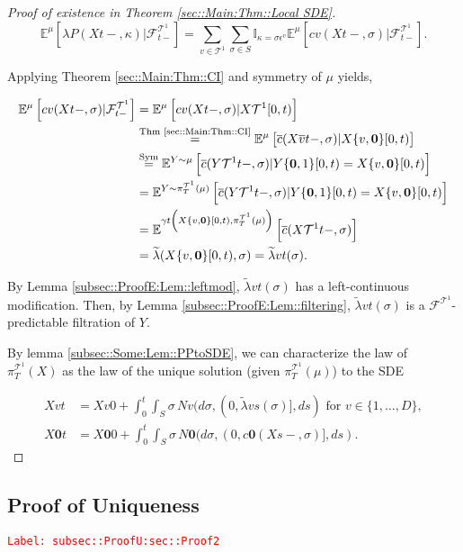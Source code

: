 \documentclass[12pt]{article}
\newcommand{\mb}{\mathbb}
\newcommand{\mc}{\mathcal}
\newcommand{\ov}{\overline}
\newcommand{\os}{\overset}
\newcommand{\te}{\text}
\newcommand{\ep}{\epsilon}
\newcommand{\tr}{\textcolor{red}}
\newcommand{\labe}[1]{\tr{\texttt{Label: #1}}}
\newcommand{\ind}{\hspace{24pt}}
\newcommand{\exmu}[2]{\mb{E}^{#1}\left[#2\right]}	%
\renewcommand{\root}{\mathbf{0}}				%
\renewcommand{\v}{v}							%
\renewcommand{\S}{S}							%
\newcommand{\s}{\sigma}							%
\newcommand{\ev}{\ep}							%
\newcommand{\T}{T}								%
\renewcommand{\t}{t}							%
\newcommand{\proj}{\pi}							%
\renewcommand{\tt}{s}							%
\newcommand{\F}{\mc{F}}							%
\newcommand{\X}{X}								%
\newcommand{\IGr}{c}							%
\newcommand{\vind}[1]{^{#1}}					%
\newcommand{\vsi}[1]{^{#1}}						%
\newcommand{\cl}{\ov}							%
\newcommand{\ts}[1]{_{#1}}						%
\newcommand{\degr}{D}							%
\newcommand{\IGrg}{\ov{c}}						%
\newcommand{\tree}{\mc{T}}						%
\newcommand{\sln}[1]{^{#1}}						%
\newcommand{\poiss}{N}							%
\newcommand{\rate}{\lambda}						%
\newcommand{\alt}[1]{\widetilde{#1}}			%
\newcommand{\m}{\mu}							%
\newcommand{\cm}{\gamma}						%
\newcommand{\XX}{Y}								%
\renewcommand{\mark}{\kappa}					%
\newcommand{\rp}{P}								%
\newcommand{\crate}{\alt{\lambda}}				%
\begin{document}
\begin{proof}[Proof of existence in Theorem \ref{sec::Main:Thm::Local SDE}]
\[\exmu{\m{}{}{}}{\rate{\rp{}}(\X{}{\t-},\mark{})|\F\vsi{\tree\sln{1}}\ts{\t-}} = \sum_{\v \in \tree\sln{1}}\sum_{\s\in \S} \mb{I}_{\mark{} = \s\ev\vind{\v}}\exmu{\m{}{}{}}{\IGr{\v}(\X{}{\t-},\s)|\F\vsi{\tree\sln{1}}\ts{\t-}}.\]

Applying Theorem \ref{sec::Main:Thm::CI} and symmetry of \(\m{}{}{}\) yields,

\begin{align*}
\exmu{\m{}{}{}}{\IGr{\v}(\X{}{\t-},\s)|\F\vsi{\tree\sln{1}}\ts{\t-}} &= \exmu{\m{}{}{}}{\IGr{\v}(\X{}{\t-},\s)|\X{\tree\sln{1}}{[0,\t)}}\\
&\os{\te{Thm \ref{sec::Main:Thm::CI}}}{=} \exmu{\m{}{}{}}{\IGrg{}(\X{\cl{\v}}{\t-},\s)|\X{\{\v,\root\}}{[0,\t)}} \\
&\os{\te{Sym}}{=} \exmu{\XX{}{}\sim \m{}{}{}}{\IGrg{}(\XX{\tree\sln{1}}{\t-},\s)|\XX{\{\root,1\}}{[0,\t)} = \X{\{\v,\root\}}{[0,\t)}}\\
&= \exmu{\XX{}{}\sim \proj\vsi{\tree\sln{1}}\ts{\T}(\m{}{}{})}{\IGrg{}(\XX{\tree\sln{1}}{\t-},\s)|\XX{\{\root,1\}}{[0,\t)} = \X{\{\v,\root\}}{[0,\t)}}\\
&= \exmu{\cm{\t}\left(\X{\{\v,\root\}}{[0,\t)},\proj\vsi{\tree\sln{1}}\ts{\T}(\m{}{}{})\right)}{\IGrg{}(\X{\tree\sln{1}}{\t-},\s)}\\
&=\crate{}{}(\X{\{\v,\root\}}{[0,\t)},\s) = \crate{\v}{\t}(\s).
\end{align*}

By Lemma \ref{subsec::ProofE:Lem::leftmod}, \(\crate{\v}{\t}(\s)\) has a left-continuous modification. Then, by Lemma \ref{subsec::ProofE:Lem::filtering}, \(\crate{\v}{\t}(\s)\) is a \(\F\vsi{\tree\sln{1}}\ts{}\)-predictable filtration of \(\XX{}{}\).

\ind By lemma \ref{subsec::Some:Lem::PPtoSDE}, we can characterize the law of \(\proj\vsi{\tree\sln{1}}\ts{\T}(\X{}{})\) as the law of the unique solution (given \(\proj\vsi{\tree\sln{1}}\ts{\T}(\m{}{}{})\)) to the SDE

\begin{align*}
\X{\v}{\t} &= \X{\v}{0} + \int_0^\t\int_\S \s\,\poiss{\v}(d\s,(0,\crate{\v}{\tt}(\s)],d\tt) \te{ for } \v \in \{1,\dots,\degr\},\\
\X{\root}{\t} &= \X{\root}{0} + \int_0^\t\int_\S \s\,\poiss{\root}(d\s,(0,\IGr{\root}(\X{}{\tt-},\s)],d\tt).
\end{align*}
\end{proof}

\subsection{Proof of Uniqueness}
\label{subsec::ProofU:sec::Proof2}\labe{subsec::ProofU:sec::Proof2}
\end{document}
